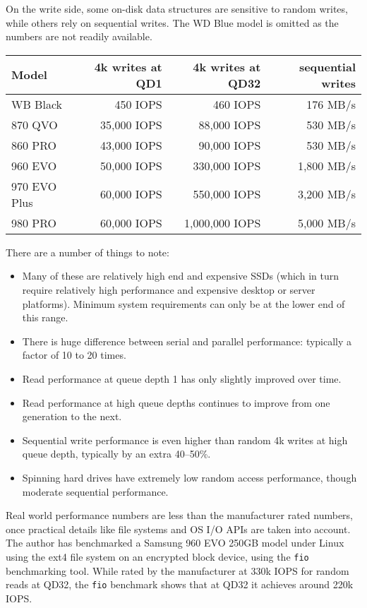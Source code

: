 \documentclass[11pt,a4paper]{article}
\begin{document}
On the write side, some on-disk data structures are sensitive to random writes,
while others rely on sequential writes. The WD Blue model is omitted as the
numbers are not readily available.
\begin{center}
\begin{tabular}[]{lrrr}
  Model & 4k writes at QD1 & 4k writes at QD32 & sequential writes \\
  \toprule
  WB Black     &    450 IOPS &       460 IOPS &   176 MB/s \\
  \midrule
  870 QVO      & 35,000 IOPS &    88,000 IOPS &   530 MB/s \\
  860 PRO      & 43,000 IOPS &    90,000 IOPS &   530 MB/s \\
  960 EVO      & 50,000 IOPS &   330,000 IOPS & 1,800 MB/s \\
  970 EVO Plus & 60,000 IOPS &   550,000 IOPS & 3,200 MB/s \\
  980 PRO      & 60,000 IOPS & 1,000,000 IOPS & 5,000 MB/s
\end{tabular}
\end{center}
There are a number of things to note:
\begin{itemize}
\item Many of these are relatively high end and expensive SSDs (which in turn
      require relatively high performance and expensive desktop or server
      platforms). Minimum system requirements can only be at the lower end of
      this range.
\item There is huge difference between serial and parallel performance:
      typically a factor of 10 to 20 times.
\item Read performance at queue depth 1 has only slightly improved over time.
\item Read performance at high queue depths continues to improve from one
      generation to the next.
\item Sequential write performance is even higher than random 4k writes at
      high queue depth, typically by an extra 40--50\%.
\item Spinning hard drives have extremely low random access performance, though
      moderate sequential performance.
\end{itemize}
Real world performance numbers are less than the manufacturer rated numbers,
once practical details like file systems and OS I/O APIs are taken into account.
The author has benchmarked a Samsung 960 EVO 250GB model under Linux using the
ext4 file system on an encrypted block device, using the {\tt fio} benchmarking
tool. While rated by the manufacturer at 330k IOPS for random reads at QD32,
the {\tt fio} benchmark shows that at QD32 it achieves around 220k IOPS.
\end{document}
